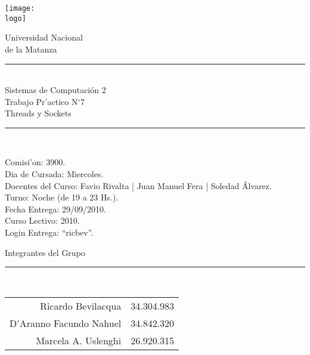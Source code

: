 

\newcommand{\materia}{Sistemas de Computaci\'on 2}
\newcommand{\team}{Grupo N$^{\circ}$63}
\newcommand{\comision}{3900}
\newcommand{\diacursada}{Miercoles}
\newcommand{\turno}{Noche (de 19 a 23 Hs.)}
\newcommand{\anio}{2010}
\newcommand{\fecha}{29/09/2010}
\newcommand{\numtp}{7}
\newcommand{\nomtp}{Threads y Sockets}
\newcommand{\docentes}{Favio Rivalta | Juan Manuel Fera | Soledad \'Alvarez}
\newcommand{\logo}{/home/ric/Documentos/Facultad/Varios/logoUnlam.png}

%
\thispagestyle{empty}

\begin{center}

 \texttt{[image: \\logo]}
 

\huge{Universidad Nacional\\de la Matanza}\\
\end{center}


\begin{center}
\rule{30mm}{.1pt}\\
\huge{\materia}\\
\huge{Trabajo Pr'actico N$^{\circ}$\numtp\\\nomtp}\\
\rule[5mm]{30mm}{.1pt}\\
\end{center}
Comisi'on: \comision.\\
Dia de Cursada: \diacursada.\\
Docentes del Curso: \docentes.\\
Turno: \turno.\\
Fecha Entrega: \fecha.\\
Curso Lectivo: \anio.\\
Login Entrega: ``ricbev''.



\begin{center}

\Large{Integrantes del Grupo}\\
\rule[2.5mm]{15mm}{.1pt}\\

\begin{tabular}{r|r}
Ricardo Bevilacqua & 34.304.983\\
D\'{ }Aranno Facundo Nahuel & 34.842.320\\
Marcela A. Uslenghi & 26.920.315
\end{tabular}



\end{center}
\newpage


%

